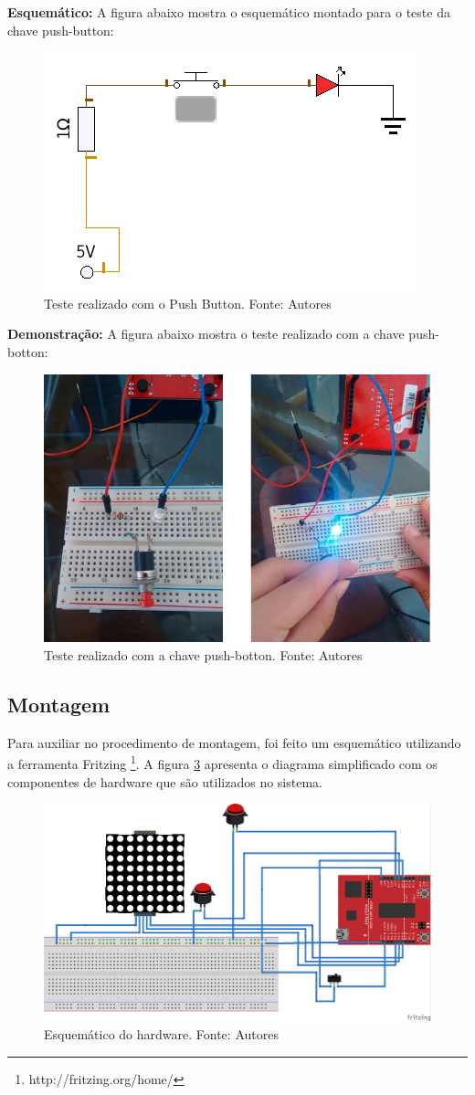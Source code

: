 \documentclass[conference]{IEEEtran}
\begin{document}
\textbf{Esquemático:}
A figura abaixo mostra o esquemático montado para o teste da chave push-button:

\begin{figure}[H]
  \centering
  \includegraphics[width=0.5\linewidth]{esq1}
  \caption{Teste realizado com o Push Button. Fonte: Autores}
  \label{fig:dem_push}
\end{figure}

\textbf{Demonstração:}
A figura abaixo mostra o teste realizado com a chave push-botton:
\begin{figure}[H]
  \centering
  \includegraphics[width=0.5\linewidth]{push-bottom}
  \caption{Teste realizado com a chave push-botton. Fonte: Autores}
  \label{fig:dem_push_botton}
\end{figure}

\subsection{Montagem}
Para auxiliar no procedimento de montagem, foi feito um esquemático utilizando a ferramenta Fritzing \footnote{http://fritzing.org/home/}. A figura \ref{fig:fritzing} apresenta o diagrama simplificado com os componentes de hardware que são utilizados no sistema. 
\begin{figure}[H]
  \centering
  \includegraphics[width=1\linewidth]{trab_bb}
  \caption{Esquemático do hardware. Fonte: Autores}
  \label{fig:fritzing}
\end{figure}
\end{document}
